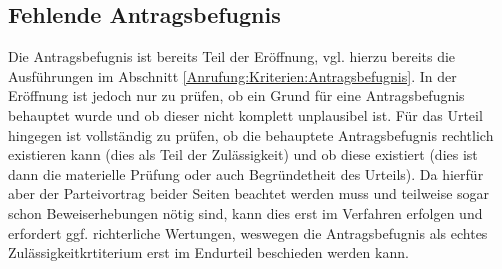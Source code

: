\subsection{Fehlende Antragsbefugnis}
\label{Zulaessigkeit:Nichtvorliegen:Antragsbefugnis}
Die Antragsbefugnis ist bereits Teil der Eröffnung, vgl. hierzu bereits die Ausführungen im Abschnitt \ref{Anrufung:Kriterien:Antragsbefugnis}.
In der Eröffnung ist jedoch nur zu prüfen, ob ein Grund für eine Antragsbefugnis behauptet wurde und ob dieser nicht komplett unplausibel ist.
Für das Urteil hingegen ist vollständig zu prüfen, ob die behauptete Antragsbefugnis rechtlich existieren kann (dies als Teil der Zulässigkeit) und ob diese existiert (dies ist dann die materielle Prüfung oder auch Begründetheit des Urteils).
Da hierfür aber der Parteivortrag beider Seiten beachtet werden muss und teilweise sogar schon Beweiserhebungen nötig sind, kann dies erst im Verfahren erfolgen und erfordert ggf. richterliche Wertungen, weswegen die Antragsbefugnis als echtes Zulässigkeitkrtiterium erst im Endurteil beschieden werden kann.

\chapterbib
